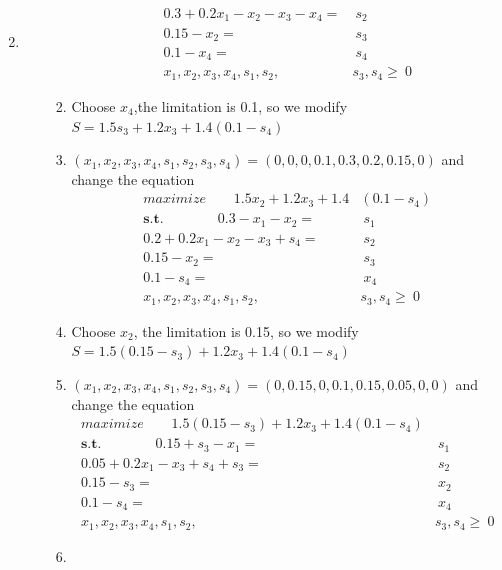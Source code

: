 \documentclass[12pt,a4paper]{article}
\makeatletter
\newtheorem*{solution}{Solution}
\theoremstyle{definition}
\renewenvironment{solution}[1][Solution] {\par\pushQED{\qed}\normalfont\topsep6\p@\@plus6\p@\relax\trivlist\item[\hskip\labelsep\bfseries#1\@addpunct{.}]\ignorespaces}{\popQED\endtrivlist\@endpefalse} \makeatother
\makeatother
\begin{document}
\begin{enumerate}
\begin{solution}
\begin{enumerate}
\begin{enumerate}
\begin{equation}
\begin{aligned}
               0.3+0.2x_1-x_2-x_3-x_4=&~s_2\\
               0.15-x_2=&~s_3\\
               0.1-x_4=&~s_4\\
               x_1,x_2,x_3,x_4,s_1,s_2,&s_3,s_4\ge~0
                \end{aligned}
            \end{equation}
                \item Choose $x_4$,the limitation is 0.1, so we modify $S=1.5s_3+1.2x_3+1.4(0.1-s_4)$
                \item $(x_1,x_2,x_3,x_4,s_1,s_2,s_3,s_4)=(0,0,0,0.1,0.3,0.2,0.15,0)$ and change the equation 
            \begin{equation}
                \begin{aligned}
                maximize ~~~~~~~~~1.5x_2+1.2x_3+1.4&(0.1-s_4)\\
                \textbf{s.t. }~~~~~~~~~~~~~~~~0.3-x_1-x_2=&~s_1\\
               0.2+0.2x_1-x_2-x_3+s_4=&~s_2\\
               0.15-x_2=&~s_3\\
               0.1-s_4=&~x_4\\
               x_1,x_2,x_3,x_4,s_1,s_2,&s_3,s_4\ge~0
                \end{aligned}
            \end{equation}
                \item
                Choose $x_2$, the limitation is 0.15, so we modify $S=1.5(0.15-s_3)+1.2x_3+1.4(0.1-s_4)$
                \item $(x_1,x_2,x_3,x_4,s_1,s_2,s_3,s_4)=(0,0.15,0,0.1,0.15,0.05,0,0)$ and change the equation 
            \begin{equation}
                \begin{aligned}
                maximize ~~~~~~~~~1.5(0.15-s_3)+1.2x_3+1.4(0.1-s_4)\\
                \textbf{s.t. }~~~~~~~~~~~~~~~~0.15+s_3-x_1=&~s_1\\
               0.05+0.2x_1-x_3+s_4+s_3=&~s_2\\
               0.15-s_3=&~x_2\\
               0.1-s_4=&~x_4\\
               x_1,x_2,x_3,x_4,s_1,s_2,&s_3,s_4\ge~0
                \end{aligned}
            \end{equation}
            \item

\end{enumerate}
\end{enumerate}
\end{solution}
\end{enumerate}
\end{document}
